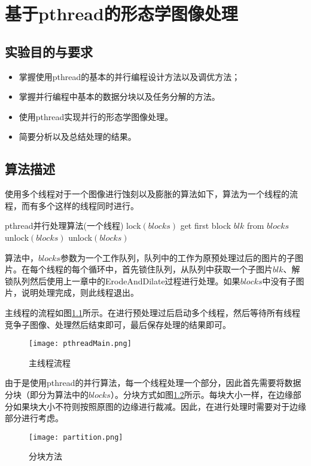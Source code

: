 \chapter{基于pthread的形态学图像处理}
\section{实验目的与要求}
\begin{itemize}
    \item 掌握使用pthread的基本的并行编程设计方法以及调优方法；
    \item 掌握并行编程中基本的数据分块以及任务分解的方法。
    \item 使用pthread实现并行的形态学图像处理。
    \item 简要分析以及总结处理的结果。
\end{itemize}

\section{算法描述}
\par 使用多个线程对于一个图像进行蚀刻以及膨胀的算法如下，算法为一个线程的流程，而有多个这样的线程同时进行。
\begin{simpleAlgorithm}{pthread并行处理算法(一个线程)}
        \State lock\((blocks)\)
        \State get first block \(blk\) from \(blocks\)
            \State unlock\((blocks)\)
            \State \Return
        \EndIf
        \State unlock\((blocks)\)
        \State {}
    \EndWhile
    \EndProcedure
\end{simpleAlgorithm}
\par 算法中，\(blocks\)参数为一个工作队列，队列中的工作为原预处理过后的图片的子图片。在每个线程的每个循环中，首先锁住队列，从队列中获取一个子图片\(blk\)、解锁队列然后使用上一章中的ErodeAndDilate过程进行处理。如果\(blocks\)中没有子图片，说明处理完成，则此线程退出。
\par 主线程的流程如图\ref{fig:pthreadMain}所示。在进行预处理过后启动多个线程，然后等待所有线程竞争子图像、处理然后结束即可，最后保存处理的结果即可。
\begin{figure}[htpb]
    \centering
    \texttt{[image: pthreadMain.png]}
    \caption{主线程流程}
    \label{fig:pthreadMain}
\end{figure}

\par 由于是使用pthread的并行算法，每一个线程处理一个部分，因此首先需要将数据分块（即分为算法中的\(blocks\)）。分块方式如图\ref{fig:partition}所示。每块大小一样，在边缘部分如果块大小不符则按照原图的边缘进行裁减。因此，在进行处理时需要对于边缘部分进行考虑。
\begin{figure}[htpb]
    \centering
    \texttt{[image: partition.png]}
    \caption{分块方法}
    \label{fig:partition}
\end{figure}

